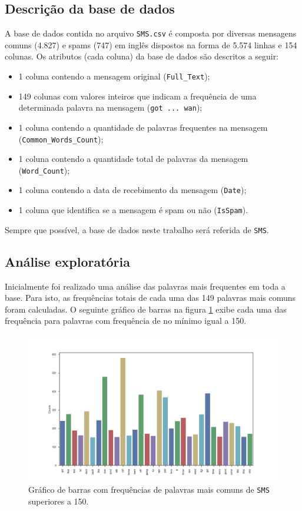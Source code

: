 \documentclass[a4paper,11pt]{article}
\begin{document}
\subsection{Descrição da base de dados}

A base de dados contida no arquivo \texttt{SMS.csv} é composta por diversas mensagens comuns (4.827)
e spams (747) em inglês dispostos na forma de 5.574 linhas e 154 colunas. Os atributos (cada coluna) 
da base de dados são descritos a seguir:

\begin{itemize}
 \item 1 coluna contendo a mensagem original (\texttt{Full\_Text});
 \item 149 colunas com valores inteiros que indicam a frequência de uma determinada palavra na 
 mensagem (\texttt{got ... wan});
 \item 1 coluna contendo a quantidade de palavras frequentes na mensagem 
 (\texttt{Common\_Words\_Count});
 \item 1 coluna contendo a quantidade total de palavras da mensagem (\texttt{Word\_Count});
 \item 1 coluna contendo a data de recebimento da mensagem (\texttt{Date});
 \item 1 coluna que identifica se a mensagem é spam ou não (\texttt{IsSpam}).
\end{itemize}

Sempre que possível, a base de dados neste trabalho será referida de \texttt{SMS}.


\subsection{Análise exploratória}

Inicialmente foi realizado uma análise das palavras mais frequentes em toda a base. Para isto, 
as frequências totais de cada uma das 149 palavras mais comuns foram calculadas. O seguinte gráfico 
de barras na figura \ref{fig:barplot} exibe cada uma das frequência para palavras com frequência de 
no mínimo igual a 150.

\begin{figure}[htbp]
    \centering
    \includegraphics[width=\textwidth]{word_barplot.png}
    \caption[Figura simples]{Gráfico de barras com frequências de palavras mais comuns de 
    \texttt{SMS} superiores a 150.}
    \label{fig:barplot}
\end{figure}
\end{document}

